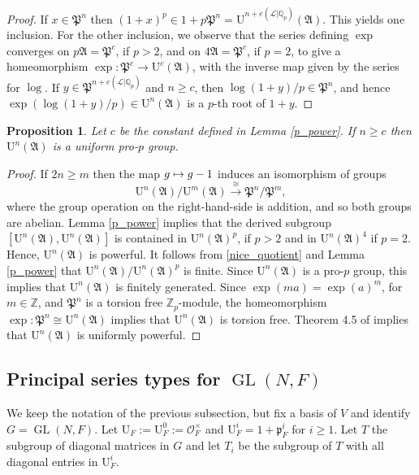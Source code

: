 \documentclass[JEP,XML,SOM,Unicode,NoEqCountersInSection]{cedram}
\let\mathcal\mathscr
\newcommand\mto{\mathchoice{\longmapsto}{\mapsto}{\mapsto}{\mapsto}}
\newtheorem{prop}{Proposition}[section]
\theoremstyle{definition}
\DeclareMathOperator{\GL}{GL}
\newcommand{\Qp}{\mathbb {Q}_p}
\newcommand{\Zp}{\mathbb{Z}_p}
\newcommand{\ZZ}{\mathbb Z}
\newcommand{\cO}{\mathcal{O}}
\newcommand{\pp}{\mathfrak p}
\newcommand{\UU}{\mathrm U}
\begin{document}
\begin{proof} If $x\in \mathfrak P^n$ then $(1+x)^p\in 1 + p\mathfrak P^n= \UU^{n+e(\mathcal L|\Qp)}(\mathfrak A)$. This yields one inclusion. For the other
inclusion, we observe that the series defining $\exp$ converges on $p \mathfrak A=\mathfrak P^c$, if $p>2$, and on $4 \mathfrak A= \mathfrak P^c$, if $p=2$, to give
a homeomorphism $\exp: \mathfrak P^c\to \UU^{c}(\mathfrak A)$, with the inverse map given by the series for $\log$. If $y\in \mathfrak P^{n+e(\mathcal L|\Qp)}$
and $n\ge c$, then $\log(1+y)/p \in \mathfrak P^n$, and hence $\exp(\log(1+y)/p)\in \UU^n(\mathfrak A)$ is a $p$-th root of $1+y$.
\end{proof}

\begin{prop}\label{uniform} Let $c$ be the constant defined in Lemma \ref{p_power}. If $n\ge c$ then $\UU^n(\mathfrak A)$ is a uniform pro-$p$ group.
\end{prop}

\begin{proof} If $2n\ge m$ then the map $g\mto g-1$ induces an isomorphism of groups
\begin{equation}\label{nice_quotient}
\UU^{n}(\mathfrak A)/\UU^{m}(\mathfrak A)\overset{\cong}{\to}\mathfrak P^n/\mathfrak P^m,
\end{equation}
where the group operation on the right-hand-side is addition, and so both groups are abelian. Lemma \ref{p_power} implies that the derived subgroup
$[\UU^n(\mathfrak A), \UU^n(\mathfrak A)]$ is contained in $\UU^n(\mathfrak A)^p$, if $p>2$ and in $\UU^n(\mathfrak A)^4$ if $p=2$. Hence, $\UU^n(\mathfrak A)$ is powerful. It follows from
\eqref{nice_quotient} and Lemma \ref{p_power} that $\UU^n(\mathfrak A)/ \UU^n(\mathfrak A)^p$ is finite. Since $\UU^n(\mathfrak A)$ is a pro-$p$
group, this implies that $\UU^n(\mathfrak A)$ is finitely generated. Since $\exp(m a)= \exp(a)^m$, for $m\in \ZZ$, and $\mathfrak P^n$ is a torsion free $\Zp$-module, the homeomorphism
$\exp: \mathfrak P^n \cong \UU^n(\mathfrak A)$ implies that $\UU^n(\mathfrak A)$ is torsion free. Theorem 4.5 of \cite{analytic} implies that $\UU^n(\mathfrak A)$ is uniformly powerful.
\end{proof}

\subsection{Principal series types for $\GL(N, F)$}\label{sec_prince} We keep the notation of the previous subsection, but fix a basis of $V$ and identify $G=\GL(N, F)$.
Let $\UU_F:=\UU^0_F:=\cO_F^{\times}$ and $\UU^i_F=1+\pp_F^i$ for $i\ge 1$. Let $T$ the subgroup of diagonal matrices in $G$ and
let $T_i$ be the subgroup of $T$ with all diagonal entries in $\UU^i_F$.
\end{document}
